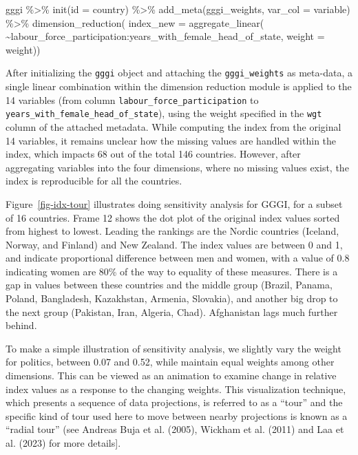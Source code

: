 \documentclass[
]{interact}
\newenvironment{Shaded}{\begin{snugshade}}{\end{snugshade}}
\newcommand{\AttributeTok}[1]{\textcolor[rgb]{0.40,0.45,0.13}{#1}}
\newcommand{\FunctionTok}[1]{\textcolor[rgb]{0.28,0.35,0.67}{#1}}
\newcommand{\NormalTok}[1]{\textcolor[rgb]{0.00,0.23,0.31}{#1}}
\newcommand{\SpecialCharTok}[1]{\textcolor[rgb]{0.37,0.37,0.37}{#1}}
\begin{document}
\begin{Shaded}
\begin{Highlighting}[]
\NormalTok{gggi }\SpecialCharTok{\%\textgreater{}\%} 
  \FunctionTok{init}\NormalTok{(}\AttributeTok{id =}\NormalTok{ country) }\SpecialCharTok{\%\textgreater{}\%}
  \FunctionTok{add\_meta}\NormalTok{(gggi\_weights, }\AttributeTok{var\_col =}\NormalTok{ variable) }\SpecialCharTok{\%\textgreater{}\%} 
  \FunctionTok{dimension\_reduction}\NormalTok{(}
    \AttributeTok{index\_new =} \FunctionTok{aggregate\_linear}\NormalTok{(}
      \SpecialCharTok{\textasciitilde{}}\NormalTok{labour\_force\_participation}\SpecialCharTok{:}\NormalTok{years\_with\_female\_head\_of\_state,}
      \AttributeTok{weight =}\NormalTok{ weight)) }
\end{Highlighting}
\end{Shaded}

After initializing the \texttt{gggi} object and attaching the
\texttt{gggi\_weights} as meta-data, a single linear combination within
the dimension reduction module is applied to the 14 variables (from
column \texttt{labour\_force\_participation} to
\texttt{years\_with\_female\_head\_of\_state}), using the weight
specified in the \texttt{wgt} column of the attached metadata. While
computing the index from the original 14 variables, it remains unclear
how the missing values are handled within the index, which impacts 68
out of the total 146 countries. However, after aggregating variables
into the four dimensions, where no missing values exist, the index is
reproducible for all the countries.

Figure~\ref{fig-idx-tour} illustrates doing sensitivity analysis for
GGGI, for a subset of 16 countries. Frame 12 shows the dot plot of the
original index values sorted from highest to lowest. Leading the
rankings are the Nordic countries (Iceland, Norway, and Finland) and New
Zealand. The index values are between 0 and 1, and indicate proportional
difference between men and women, with a value of 0.8 indicating women
are 80\% of the way to equality of these measures. There is a gap in
values between these countries and the middle group (Brazil, Panama,
Poland, Bangladesh, Kazakhstan, Armenia, Slovakia), and another big drop
to the next group (Pakistan, Iran, Algeria, Chad). Afghanistan lags much
further behind.

To make a simple illustration of sensitivity analysis, we slightly vary
the weight for politics, between 0.07 and 0.52, while maintain equal
weights among other dimensions. This can be viewed as an animation to
examine change in relative index values as a response to the changing
weights. This visualization technique, which presents a sequence of data
projections, is referred to as a ``tour'' and the specific kind of tour
used here to move between nearby projections is known as a ``radial
tour'' (see Andreas Buja et al. (2005), Wickham et al. (2011) and Laa et
al. (2023) for more details{]}.
\end{document}
